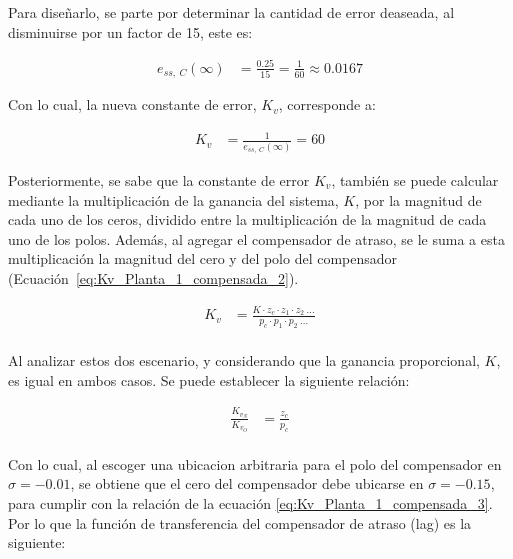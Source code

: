 \documentclass[journal]{IEEEtran}
\begin{document}
Para diseñarlo, se parte por determinar la cantidad de error deaseada, al disminuirse por un factor
de 15, este es:

\begin{equation}
        \begin{aligned}
                e_{ss,~C}(\infty) &= \frac{0.25}{15} = \frac{1}{60} \approx 0.0167
        \end{aligned}
\label{eq:Error_Planta_1_compensada}
\end{equation}

Con lo cual, la nueva constante de error, $K_v$, corresponde a:

\begin{equation}
        \begin{aligned}
                K_v &= \frac{1}{e_{ss,~C}(\infty)} = 60
        \end{aligned}
\label{eq:Kv_Planta_1_compensada}
\end{equation}

Posteriormente, se sabe que la constante de error $K_v$, también se puede calcular mediante la multiplicación
de la ganancia del sistema, $K$, por la magnitud de cada uno de los ceros, dividido entre la multiplicación
de la magnitud de cada uno de los polos. Además, al agregar el compensador de atraso, se le suma a esta multiplicación
la magnitud del cero y del polo del compensador (Ecuación~\eqref{eq:Kv_Planta_1_compensada_2}).

\begin{equation}
        \begin{aligned}
                K_v &= \frac{K \cdot z_c \cdot z_1 \cdot z_2~...}{p_c \cdot p_1 \cdot p_2~...} \\
        \end{aligned}
\label{eq:Kv_Planta_1_compensada_2}
\end{equation}

Al analizar estos dos escenario, y considerando que la ganancia proporcional, $K$, es igual en ambos casos.
Se puede establecer la siguiente relación:

\begin{equation}
        \begin{aligned}
                \frac{K_{v_N}}{K_{v_O}} &= \frac{z_c}{p_c} \\
        \end{aligned}
\label{eq:Kv_Planta_1_compensada_3}
\end{equation}

Con lo cual, al escoger una ubicacion arbitraria para el polo del compensador en $\sigma = -0.01$,
se obtiene que el cero del compensador debe ubicarse en $\sigma = -0.15$, para cumplir con la relación
de la ecuación \eqref{eq:Kv_Planta_1_compensada_3}. 
Por lo que la función de transferencia del compensador de atraso (lag) es la siguiente:
\end{document}
